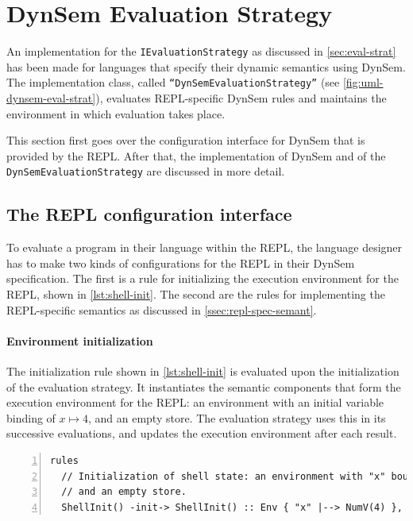 \section{DynSem Evaluation Strategy}
\label{sec:dynsem-eval-strat}
An implementation for the \texttt{IEvaluationStrategy} as discussed in
\cref{sec:eval-strat} has been made for languages that specify their dynamic
semantics using DynSem. The implementation class, called
\texttt{``DynSemEvaluationStrategy''} (see \cref{fig:uml-dynsem-eval-strat}),
evaluates REPL-specific DynSem rules and maintains the environment in which
evaluation takes place.

This section first goes over the configuration interface for DynSem that is
provided by the REPL. After that, the implementation of DynSem and of the
\texttt{DynSemEvaluationStrategy} are discussed in more detail.

\subsection{The REPL configuration interface}
\label{sec:impl-repl-spec}
To evaluate a program in their language within the REPL, the language designer
has to make two kinds of configurations for the REPL in their DynSem
specification. The first is a rule for initializing the execution environment
for the REPL, shown in \cref{lst:shell-init}. The second are the rules for
implementing the REPL-specific semantics as discussed in
\cref{ssec:repl-spec-semant}.

\paragraph{Environment initialization} The initialization rule shown in
\cref{lst:shell-init} is evaluated upon the initialization of the evaluation
strategy. It instantiates the semantic components that form the execution
environment for the REPL: an environment with an initial variable binding of
$x \mapsto 4$, and an empty store. The evaluation strategy uses this in its
successive evaluations, and updates the execution environment after each result.

\begin{minipage}{\textwidth}
\begin{lstlisting}[language=dynsem,caption={The initialization rule for the
semantic components.},label={lst:shell-init},numbers=left]
rules
  // Initialization of shell state: an environment with "x" bound to 4,
  // and an empty store.
  ShellInit() -init-> ShellInit() :: Env { "x" |--> NumV(4) }, Store {}.
\end{lstlisting}
\end{minipage}

